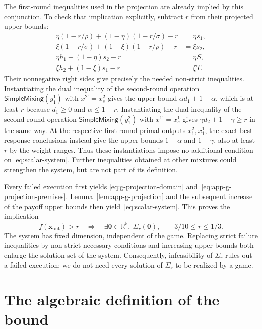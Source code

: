 \documentclass[11pt]{article}
\theoremstyle{remark}
\theoremstyle{plain}
\newcommand{\sm}{\mathsf{SimpleMixing}}
\begin{document}
The first-round inequalities used in the projection are already
implied by this conjunction. To check that implication explicitly,
subtract $r$ from their projected upper bounds:
\begin{equation}
 \begin{aligned}
 \eta(1-r/\rho)+(1-\eta)(1-r/\sigma)-r&=\eta s_1,\\
 \xi(1-r/\sigma)+(1-\xi)(1-r/\rho)-r&=\xi s_2,\\
 \eta h_1+(1-\eta)s_2-r&=\eta S,\\
 \xi h_2+(1-\xi)s_1-r&=\xi T.
 \end{aligned}
 \label{eq:app-first-round-projected-identities}
\end{equation}
Their nonnegative right sides give precisely the needed
non-strict inequalities.
Instantiating the dual inequality of the second-round operation
$\sm(y_1^1)$ with $x^{2\prime}=x_s^2$ gives the upper bound
$\alpha d_1+1-\alpha$, which is at least $r$ because $d_1\ge0$
and $\alpha\le1-r$. Instantiating the dual inequality of the
second-round operation $\sm(y_1^2)$ with $x^{1\prime}=x_s^1$
gives $\gamma d_2+1-\gamma\ge r$ in the same way. At the respective first-round primal outputs $x_1^2,x_1^1$,
the exact best-response conclusions instead give the upper bounds
$1-\alpha$ and $1-\gamma$, also at least $r$ by the weight ranges.
Thus these instantiations impose no additional condition on
\eqref{eq:scalar-system}. Further inequalities obtained at other
mixtures could strengthen the system, but are not part of its
definition.

Every failed execution first yields
\eqref{eq:g-projection-domain} and~\eqref{eq:app-g-projection-premises}.
Lemma~\ref{lem:app-g-projection} and the subsequent increase of
the payoff upper bounds then yield~\eqref{eq:scalar-system}.
This proves the implication
\begin{equation}
 f(\boldsymbol x_{\mathrm{out}})>r
 \quad\Longrightarrow\quad
 \exists\boldsymbol\theta\in\mathbb R^5,\ 
             \Sigma_r(\boldsymbol\theta),
 \qquad 3/10\le r\le1/3.
 \label{eq:app-failure-implies-scalar-system}
\end{equation}
The system has fixed dimension, independent of the game.
Replacing strict failure inequalities by non-strict necessary
conditions and increasing upper bounds both enlarge the solution set
of the system.
Consequently, infeasibility of $\Sigma_r$ rules out a failed
execution; we do not need every solution of $\Sigma_r$ to be
realized by a game.

\section{The algebraic definition of the bound}
\label{app:discovery}
\end{document}
